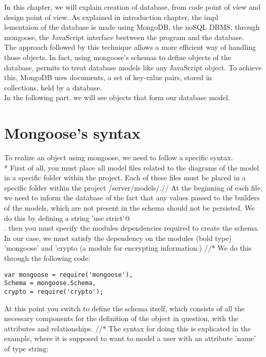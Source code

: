 
In this chapter, we will explain creation of database, from code point of view and design point of view. As explained in introduction chapter, the impl\\
lementaion of the database is made using MongoDB, the noSQL DBMS, through mongoose, the JavaScript interface beetween the program and the database.
\\
The approach followed by this technique allows a more efficient way of handling those objects. In fact, using mongoose's schemas to define objects of the\\
database, permits to treat database models like any JavaScript object. To achieve this, MongoDB uses documents, a set of key-value pairs, stored in \\
collections, held by a database. 
\\
In the following part, we will see objects that form our database model.

\section{Mongoose's syntax}
To realize an object using mongoose, we need to follow a specific syntax. \\* First of all, you must place all model files related to the diagrams of the model in a specific folder within the project. Each of these files must be placed in a specific folder within the project /server/models/.//
At the beginning of each file, we need to inform the database of the fact that any values ​​passed to the builders of the models, which are not present in the schema should not be persisted. We do this by defining a string \mbox{}\verb@ 'use strict'@\\.
then you must specify the modules dependencies required to create the schema. In our case, we must satisfy the dependency on the modules (bold type) 'mongoose' and 'crypto (a module for encrypting information.) //*   We do this through the following code: 
\begin{verbatim}      
var mongoose = require('mongoose'),
Schema = mongoose.Schema,
crypto = require('crypto');
\end{verbatim}

At this point you switch to define the schema itself, which consists of all the necessary components for the definition of the object in question, with the attributes and relationships. //*
The syntax for doing this is explicated in the example, where it is supposed to want to model a user with an attribute 'name' of type string: 

